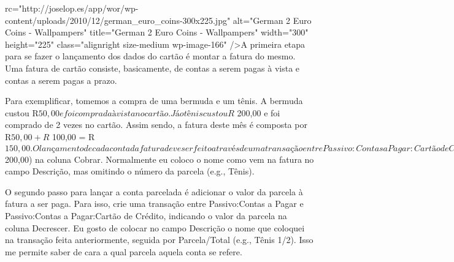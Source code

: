 rc="http://joselop.es/app/wor/wp-content/uploads/2010/12/german_euro_coins-300x225.jpg" alt="German 2 Euro Coins - Wallpampers" title="German 2 Euro Coins - Wallpampers" width="300" height="225" class="alignright size-medium wp-image-166" />A primeira etapa para se fazer o lançamento dos dados do cartão é montar a fatura do mesmo. Uma fatura de cartão consiste, basicamente, de contas a serem pagas à vista e contas a serem pagas a prazo.

Para exemplificar, tomemos a compra de uma bermuda e um tênis. A bermuda custou R$ 50,00 e foi comprada à vista no cartão. Já o tênis custou R$ 200,00 e foi comprado de 2 vezes no cartão. Assim sendo, a fatura deste mês é composta por R$ 50,00 + R$ 100,00 = R$ 150,00.

O lançamento de cada conta da fatura deve ser feito através de uma transação entre Passivo:Contas a Pagar:Cartão de Crédito e o seu correspondente em Ativos ou Despesas, dependendo do bem adquirido - leia o primeiro post para entender sobre bens de consumo. No caso deste exemplo, prefiro considerar os dois bens adquiridos como subprodutos de Despesas.

<h3>À Vista</h3>

Os bens que serão pagos à vista podem ser lançados diretamente como uma transação entre Passivo:Contas a Pagar:Cartão de Crédito e o seu par em Ativos ou Despesas. No caso da bermuda, pode-se classificá-la como uma despesa com vestuário. Assim abra Passivos:Contas a Pagar:Cartão de Crédito e crie uma transação para Despesas:Vestuário no valor do bem, indicando esse valor na coluna Cobrar. Eu uso colocar na coluna Descrição, a indicação igual à que vem na fatura do cartão, para facilitar a identificação.

<h3>A Prazo</h3>

Os bens que serão pagos a prazo são um pouco mais complicados de serem lançados. A primeira coisa a se fazer é lançar o valor total da compra como uma transação entre Passivo:Contas a Pagar e o correspondente à compra em Ativos ou Despesas - como descrito anteriormente. Dessa forma, no caso do tênis, dever-se-ia criar uma transação entre Passivo:Contas a Pagar e Despesas:Vestuário, indicando o valor da compra (R$ 200,00) na coluna Cobrar. Normalmente eu coloco o nome como vem na fatura no campo Descrição, mas omitindo o número da parcela (e.g., Tênis).

O segundo passo para lançar a conta parcelada é adicionar o valor da parcela à fatura a ser paga. Para isso, crie uma transação entre Passivo:Contas a Pagar e Passivo:Contas a Pagar:Cartão de Crédito, indicando o valor da parcela na coluna Decrescer. Eu gosto de colocar no campo Descrição o nome que coloquei na transação feita anteriormente, seguida por Parcela/Total (e.g., Tênis 1/2). Isso me permite saber de cara a qual parcela aquela conta se refere.

